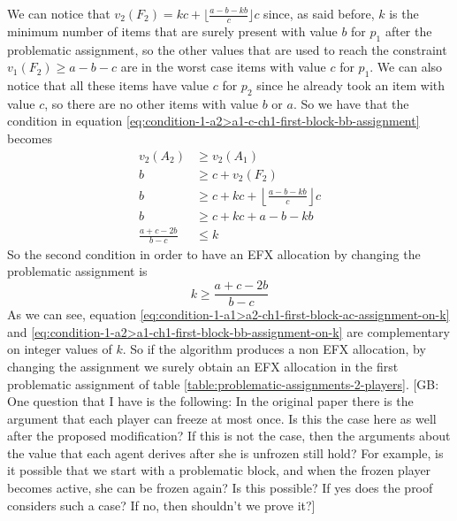 \documentclass{article}
\newcommand{\gb}[1]{{\color{red}[GB: #1]}}
\begin{document}
We can notice that $v_2(F_2) = kc + \lfloor \frac{a-b-kb}{c} \rfloor c$ since, as said before, $k$ is the minimum number of items that are surely present with value $b$ for $p_1$ after the problematic assignment, so the other values that are used to reach the constraint $v_1(F_2) \ge a-b-c$ are in the worst case items with value $c$ for $p_1$. We can also notice that all these items have value $c$ for $p_2$ since he already took an item with value $c$, so there are no other items with value $b$ or $a$. So we have that the condition in equation \ref{eq:condition-1-a2>a1-c-ch1-first-block-bb-assignment} becomes
\begin{align*}
    v_2(A_2) &\ge v_2(A_1)\\
     b  &\ge  c + v_2(F_2)\\
      b  &\ge  c +  kc + \left\lfloor \frac{a-b-kb}{c} \right\rfloor c\\
      b  &\ge  c +  kc + a-b-kb\\
      \frac{a + c -2b}{b-c}  &\le   k
\end{align*}
So the second condition in order to have an EFX allocation by changing the problematic assignment is 
\begin{equation}
    k \ge \frac{a + c -2b}{b-c}
    \label{eq:condition-1-a2>a1-ch1-first-block-bb-assignment-on-k}
\end{equation}
As we can see, equation \ref{eq:condition-1-a1>a2-ch1-first-block-ac-assignment-on-k} and \ref{eq:condition-1-a2>a1-ch1-first-block-bb-assignment-on-k} are complementary on integer values of $k$. So if the algorithm produces a non EFX allocation, by changing the assignment we surely obtain an EFX allocation in the first problematic assignment of table \ref{table:problematic-assignments-2-players}. 
\gb{One question that I have is the following: In the original paper there is the argument that each player can freeze at most once. Is this the case here as well after the proposed modification? If this is not the case, then the arguments about the value that each agent derives after she is unfrozen still hold? For example, is it possible that we start with a problematic block, and when the frozen player becomes active, she can be frozen again? Is this possible? If yes does the proof considers such a case? If no, then shouldn't we prove it?}
\end{document}

